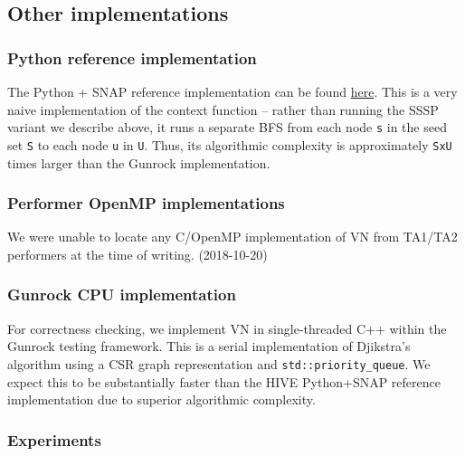 \documentclass[10pt,oneside]{memoir}
\begin{document}
\hypertarget{other-implementations}{%
\subsection{Other implementations}\label{other-implementations}}

\hypertarget{python-reference-implementation}{%
\subsubsection{Python reference
implementation}\label{python-reference-implementation}}

The Python + SNAP reference implementation can be found
\href{https://gitlab.hiveprogram.com/ggillary/vertex_nomination_Enron/blob/master/snap_vertex_nomination.py}{here}.
This is a very naive implementation of the context function -- rather
than running the SSSP variant we describe above, it runs a separate BFS
from each node \texttt{s} in the seed set \texttt{S} to each node
\texttt{u} in \texttt{U}. Thus, its algorithmic complexity is
approximately \texttt{\textbar{}S\textbar{}x\textbar{}U\textbar{}} times
larger than the Gunrock implementation.

\hypertarget{performer-openmp-implementations}{%
\subsubsection{Performer OpenMP
implementations}\label{performer-openmp-implementations}}

We were unable to locate any C/OpenMP implementation of VN from TA1/TA2
performers at the time of writing. (2018-10-20)

\hypertarget{gunrock-cpu-implementation}{%
\subsubsection{Gunrock CPU
implementation}\label{gunrock-cpu-implementation}}

For correctness checking, we implement VN in single-threaded C++ within
the Gunrock testing framework. This is a serial implementation of
Djikstra's algorithm using a CSR graph representation and
\texttt{std::priority\_queue}. We expect this to be substantially faster
than the HIVE Python+SNAP reference implementation due to superior
algorithmic complexity.

\hypertarget{experiments-2}{%
\subsubsection{Experiments}\label{experiments-2}}
\end{document}
